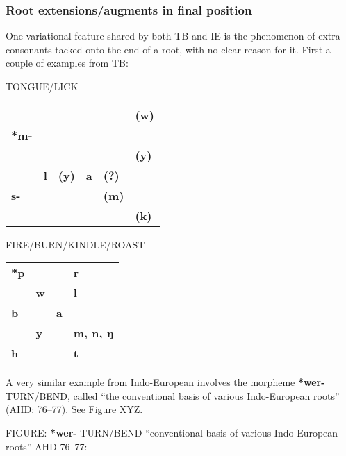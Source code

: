	
\subsubsection{Root extensions/augments in final position}
One variational feature shared by both TB and IE is the phenomenon of extra consonants tacked onto the end of a root, with no clear reason for it. First a couple of examples from TB:

		
TONGUE/LICK
\begin{tabular}{l l l l l l}
 & & & & & \textbf{(w)}\\
\textbf{*m-} & & & & & \\
 & & & & & \textbf{(y)}\\
 & \textbf{l} & \textbf{(y)} & \textbf{a} & \textbf{(?)} & \\	
\textbf{s-} & & & & \textbf{(m)}\\
 & & & & & \textbf{(k)}\\
\end{tabular}



FIRE/BURN/KINDLE/ROAST
\begin{tabular}{l l l l}
\textbf{*p} & & & \textbf{r}\\
 & \textbf{w} & & \textbf{l}\\
\textbf{b} & & \textbf{a} & \\	
 & \textbf{y} & & \textbf{m, n, ŋ}\\	
\textbf{h} & & & \textbf{t}\\
\end{tabular}

A very similar example from Indo-European involves the morpheme \textbf{*wer-} TURN/BEND, called “the conventional basis of various Indo-European roots” (AHD: 76–77). See Figure XYZ.

FIGURE: \textbf{*wer-} TURN/BEND  “conventional basis of various Indo-European roots”  AHD 76–77:

